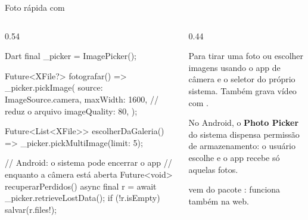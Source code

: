 \documentclass[aspectratio=169,10pt]{beamer}
\begin{document}
\begin{frame}[fragile]{Foto rápida com }
  \begin{columns}[T]
    \begin{column}{0.54\textwidth}
\begin{codigo}[title=Foto do equipamento]{Dart}
final _picker = ImagePicker();

Future<XFile?> fotografar() => _picker.pickImage(
      source: ImageSource.camera,
      maxWidth: 1600,          // reduz o arquivo
      imageQuality: 80,
    );

Future<List<XFile>> escolherDaGaleria() =>
    _picker.pickMultiImage(limit: 5);

// Android: o sistema pode encerrar o app
// enquanto a câmera está aberta
Future<void> recuperarPerdidos() async {
  final r = await _picker.retrieveLostData();
  if (!r.isEmpty) salvar(r.files!);
}
\end{codigo}
    \end{column}
    \begin{column}{0.44\textwidth}
      \begin{conceito}
        Para tirar uma foto ou escolher imagens usando o app de câmera e o seletor do próprio sistema. Também grava vídeo com .
      \end{conceito}
      \begin{dica}
        No Android, o \textbf{Photo Picker} do sistema dispensa permissão de armazenamento: o usuário escolhe e o app recebe só aquelas fotos.
      \end{dica}
      \begin{dica}
         vem do pacote : funciona também na web.
      \end{dica}
    \end{column}
  \end{columns}
\end{frame}
\end{document}

